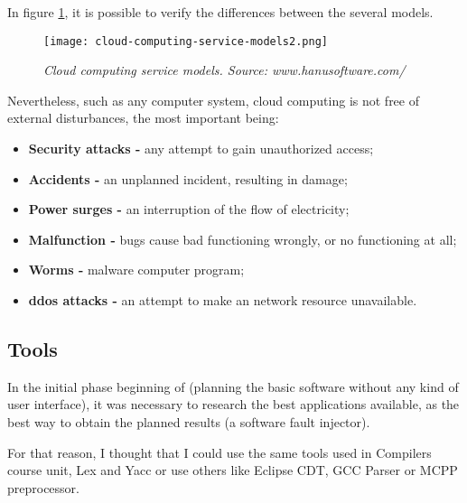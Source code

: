 In figure \ref{fig:cloudcomputingservicemodels}, it is possible to verify the differences between the several models.

\begin{figure}[!ht]
\begin{center}
\texttt{[image: cloud-computing-service-models2.png]}
\caption{\small \sl Cloud computing service models. \textit{Source: www.hanusoftware.com/}\label{fig:cloudcomputingservicemodels}}
\end{center}
\end{figure}

Nevertheless, such as any computer system, cloud computing is not free of external disturbances\cite{wolter2012resilience}, the most important being:
\begin{itemize}
 	\item \textbf{Security attacks -} any attempt to gain unauthorized access;
 	\item \textbf{Accidents -} an unplanned incident, resulting in damage;
 	\item \textbf{Power surges -} an interruption of the flow of electricity;
 	\item \textbf{Malfunction -} bugs cause bad functioning wrongly, or no functioning at all;
 	\item \textbf{Worms -} malware computer program;
 	\item \textbf{\acl{ddos} attacks -} an attempt to make an network resource unavailable.
 \end{itemize}

\clearpage
\subsection{Tools}

In the initial phase beginning of (planning the basic software without any kind of user interface), it was necessary to research the best applications available, as the best way to obtain the planned results (a software fault injector).

For that reason, I thought that I could use the same tools used in Compilers course unit, Lex and Yacc or use others like Eclipse CDT, GCC Parser or MCPP preprocessor.\\


